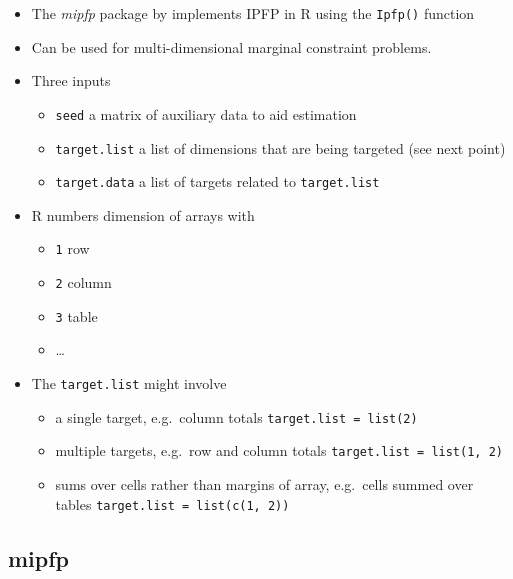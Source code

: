 \documentclass[
]{book}
\providecommand{\tightlist}{%
  \setlength{\itemsep}{0pt}\setlength{\parskip}{0pt}}
\begin{document}
\begin{itemize}
\tightlist
\item
  The \emph{mipfp} package by \citet{Barthelemy2018} implements IPFP in R using the \texttt{Ipfp()} function
\item
  Can be used for multi-dimensional marginal constraint problems.
\item
  Three inputs

  \begin{itemize}
  \tightlist
  \item
    \texttt{seed} a matrix of auxiliary data to aid estimation
  \item
    \texttt{target.list} a list of dimensions that are being targeted (see next point)
  \item
    \texttt{target.data} a list of targets related to \texttt{target.list}
  \end{itemize}
\item
  R numbers dimension of arrays with

  \begin{itemize}
  \tightlist
  \item
    \texttt{1} row
  \item
    \texttt{2} column
  \item
    \texttt{3} table
  \item
    \ldots{}
  \end{itemize}
\item
  The \texttt{target.list} might involve

  \begin{itemize}
  \tightlist
  \item
    a single target, e.g.~column totals \texttt{target.list\ =\ list(2)}
  \item
    multiple targets, e.g.~row and column totals \texttt{target.list\ =\ list(1,\ 2)}
  \item
    sums over cells rather than margins of array, e.g.~cells summed over tables \texttt{target.list\ =\ list(c(1,\ 2))}
  \end{itemize}
\end{itemize}

\hypertarget{mipfp-1}{%
\subsection{mipfp}\label{mipfp-1}}
\end{document}
